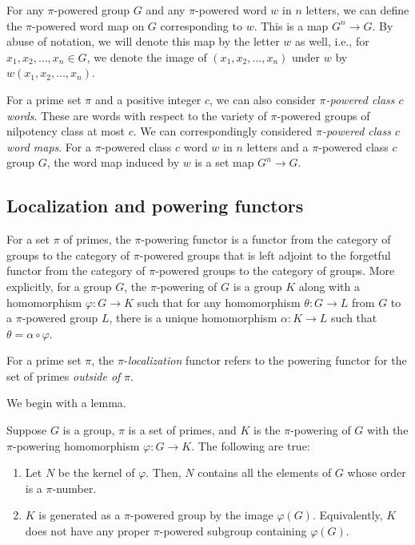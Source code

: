 For any $\pi$-powered group $G$ and any $\pi$-powered word $w$ in $n$
letters, we can define the $\pi$-powered word map on $G$ corresponding
to $w$. This is a map $G^n \to G$. By abuse of notation, we will
denote this map by the letter $w$ as well, i.e., for
$x_1,x_2,\dots,x_n \in G$, we denote the image of
$(x_1,x_2,\dots,x_n)$ under $w$ by $w(x_1,x_2,\dots,x_n)$.

For a prime set $\pi$ and a positive integer $c$, we can also consider
{\em $\pi$-powered class $c$ words}. These are words with respect to
the variety of $\pi$-powered groups of nilpotency class at most
$c$. We can correspondingly considered {\em $\pi$-powered class $c$
  word maps}. For a $\pi$-powered class $c$ word $w$ in $n$ letters
and a $\pi$-powered class $c$ group $G$, the word map induced by $w$
is a set map $G^n \to G$.

\subsection{Localization and powering functors}\label{sec:localization-and-powering-functors}

For a set $\pi$ of primes, the $\pi$-powering functor is a functor
from the category of groups to the category of $\pi$-powered groups
that is left adjoint to the forgetful functor from the category of
$\pi$-powered groups to the category of groups. More explicitly, for a
group $G$, the $\pi$-powering of $G$ is a group $K$ along with a
homomorphism $\varphi:G \to K$ such that for any homomorphism
$\theta:G \to L$ from $G$ to a $\pi$-powered group $L$, there is a
unique homomorphism $\alpha:K \to L$ such that $\theta = \alpha \circ
\varphi$.

For a prime set $\pi$, the $\pi$-{\em localization} functor refers to
the powering functor for the set of primes {\em outside of} $\pi$.

We begin with a lemma.

\begin{lemma}\label{lemma:pi-powering-arbitrary-group}
  Suppose $G$ is a group, $\pi$ is a set of primes, and $K$ is the
  $\pi$-powering of $G$ with the $\pi$-powering homomorphism
  $\varphi:G \to K$. The following are true:

  \begin{enumerate}
  \item Let $N$ be the kernel of $\varphi$. Then, $N$ contains all the
    elements of $G$ whose order is a $\pi$-number.
  \item $K$ is generated as a $\pi$-powered group by the image
    $\varphi(G)$. Equivalently, $K$ does not have any proper $\pi$-powered
    subgroup containing $\varphi(G)$.
  \end{enumerate}
\end{lemma}


